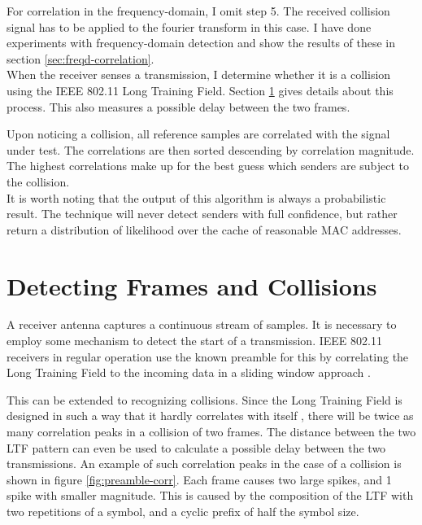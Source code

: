 For correlation in the frequency-domain, I omit step 5. The received collision signal has to be applied to the fourier transform in this case. I have done experiments with frequency-domain detection and show the results of these in section \ref{sec:freqd-correlation}.\\

When the receiver senses a transmission, I determine whether it is a collision using the IEEE 802.11 Long Training Field. Section \ref{sec:preamble-corr} gives details about this process. This also measures a possible delay between the two frames.

Upon noticing a collision, all reference samples are correlated with the signal under test. The correlations are then sorted descending by correlation magnitude. The highest correlations make up for the best guess which senders are subject to the collision.\\

It is worth noting that the output of this algorithm is always a probabilistic result. The technique will never detect senders with full confidence, but rather return a distribution of likelihood over the cache of reasonable MAC addresses.



\section{Detecting Frames and Collisions}\label{sec:preamble-corr}

A receiver antenna captures a continuous stream of samples. It is necessary to employ some mechanism to detect the start of a transmission. IEEE 802.11 receivers in regular operation use the known preamble for this by correlating the Long Training Field to the incoming data in a sliding window approach \cite{perahia2013}.

This can be extended to recognizing collisions. Since the Long Training Field is designed in such a way that it hardly correlates with itself \cite{ieee2012}, there will be twice as many correlation peaks in a collision of two frames. The distance between the two LTF pattern can even be used to calculate a possible delay between the two transmissions. An example of such correlation peaks in the case of a collision is shown in figure \ref{fig:preamble-corr}. Each frame causes two large spikes, and 1 spike with smaller magnitude. This is caused by the composition of the LTF with two repetitions of a symbol, and a cyclic prefix of half the symbol size.\\

